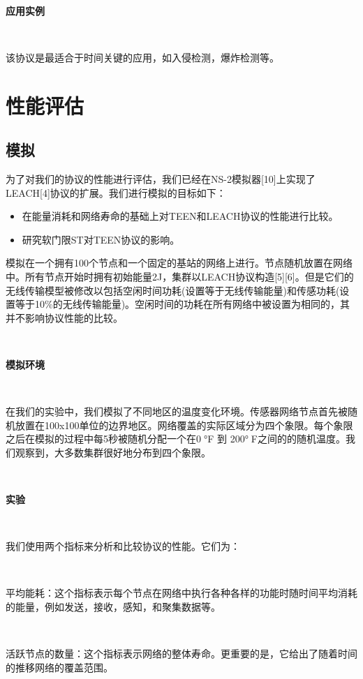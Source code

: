 \documentclass[journal]{IEEEtran}
\begin{document}
\begin{CJK}{UTF8}{gbsn}
\

\textbf{应用实例}

\

该协议是最适合于时间关键的应用，如入侵检测，爆炸检测等。

\section{\textbf{性能评估}}

\subsection{\textbf{模拟}}

为了对我们的协议的性能进行评估，我们已经在NS-2模拟器[10]上实现了LEACH[4]协议的扩展。我们进行模拟的目标如下：

\begin{itemize}
  \item 在能量消耗和网络寿命的基础上对TEEN和LEACH协议的性能进行比较。
  \item 研究软门限ST对TEEN协议的影响。  

\end{itemize}

模拟在一个拥有100个节点和一个固定的基站的网络上进行。节点随机放置在网络中。所有节点开始时拥有初始能量2J，集群以LEACH协议构造[5][6]。但是它们的无线传输模型被修改以包括空闲时间功耗(设置等于无线传输能量)和传感功耗(设置等于10\%的无线传输能量)。空闲时间的功耗在所有网络中被设置为相同的，其并不影响协议性能的比较。%

\

\textbf{模拟环境}

\

在我们的实验中，我们模拟了不同地区的温度变化环境。传感器网络节点首先被随机放置在100x100单位的边界地区。网络覆盖的实际区域分为四个象限。每个象限之后在模拟的过程中每5秒被随机分配一个在0°F 到 200°F之间的的随机温度。我们观察到，大多数集群很好地分布到四个象限。

\

\textbf{实验}

\

我们使用两个指标来分析和比较协议的性能。它们为：

\

平均能耗：这个指标表示每个节点在网络中执行各种各样的功能时随时间平均消耗的能量，例如发送，接收，感知，和聚集数据等。

\

活跃节点的数量：这个指标表示网络的整体寿命。更重要的是，它给出了随着时间的推移网络的覆盖范围。


\end{CJK}
\end{document}
